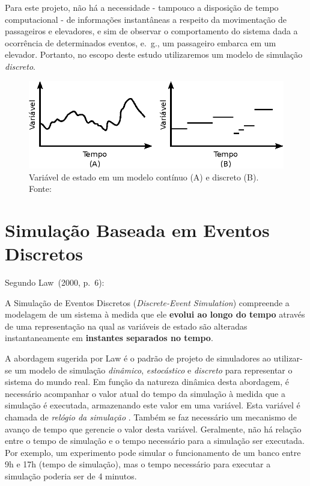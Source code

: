 \begin{enumerate}
Para este projeto, não há a necessidade - tampouco a disposição de tempo
computacional - de informações instantâneas a respeito da movimentação de
passageiros e elevadores, e sim de observar o comportamento do sistema dada a
ocorrência de determinados eventos, e.~g., um passageiro embarca em um elevador.
Portanto, no escopo deste estudo utilizaremos um modelo de simulação
\textit{discreto}.

\begin{figure}[htb!]
\centering\includegraphics{img/discrete_continuous.eps}
\caption{\label{fig:disccont}Variável de estado em um modelo contínuo (A) e discreto (B). Fonte:~\cite{Banks}}
\end{figure}

\end{enumerate}

\section{Simulação Baseada em Eventos Discretos}

Segundo Law~(2000, p.~6):

\begin{directcite}
A Simulação de Eventos Discretos (\textit{Discrete-Event Simulation}) compreende
a modelagem de um sistema à medida que ele \textbf{evolui ao longo do tempo}
através de uma representação na qual as variáveis de estado são alteradas
instantaneamente em \textbf{instantes separados no tempo}.
\end{directcite}

A abordagem sugerida por Law é o padrão de projeto de simuladores ao utilizar-se
um modelo de simulação \textit{dinâmico}, \textit{estocástico} e
\textit{discreto} para representar o sistema do mundo real. Em função da
natureza dinâmica desta abordagem, é necessário acompanhar o valor atual do
tempo da simulação à medida que a simulação é executada, armazenando este valor
em uma variável. Esta variável é chamada de \textit{relógio da simulação}
\cite{Law}. Também se faz necessário um mecanismo de avanço de tempo que
gerencie o valor desta variável. Geralmente, não há relação entre o tempo de
simulação e o tempo necessário para a simulação ser executada. Por exemplo, um
experimento pode simular o funcionamento de um banco entre 9h e 17h (tempo de
simulação), mas o tempo necessário para executar a simulação poderia ser de 4
minutos.

